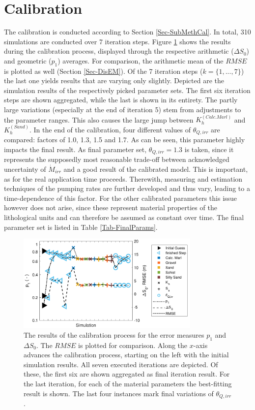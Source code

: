 \section{Calibration}

The calibration is conducted according to Section \ref{Sec-SubMethCal}. 
In total, 310 simulations are conducted over 7 iteration steps. 
Figure \ref{Fig-CalibResults} shows the results during the calibration process, displayed through the respective arithmetic ($\Delta S_0$) and geometric ($p_1$) averages. 
For comparison, the arithmetic mean of the $RMSE$ is plotted as well (Section \ref{Sec-DisEM}). 
Of the 7 iteration steps ($k = \{ 1,...,7\}$) the last one yields results that are varying only slightly. 
Depicted are the simulation results of the respectively picked parameter sets. 
The first six iteration steps are shown aggregated, while the last is shown in its entirety. 
The partly large variations (especially at the end of iteration 5) stem from adjustments to the parameter ranges. 
This also causes the large jump between $K_h^{(Calc. Marl)}$ and $K_h^{(Sand)}$. 
In the end of the calibration, four different values of $\theta_{Q,irr}$ are compared: factors of 1.0, 1.3, 1.5 and 1.7. 
As can be seen, this parameter highly impacts the final result. 
As final parameter set, $\theta_{Q,irr}=1.3$ is taken, since it represents the supposedly most reasonable trade-off between acknowledged uncertainty of $\dot{M}_{irr}$ and a good result of the calibrated model. 
This is important, as for the real application time proceeds. 
Therewith, measuring and estimation techniques of the pumping rates are further developed and thus vary, leading to a time-dependence of this factor. 
For the other calibrated parameters this issue however does not arise, since these represent material properties of the lithological units and can therefore be assumed as constant over time. 
The final parameter set is listed in Table \ref{Tab-FinalParams}.

\begin{figure}[h]
    \centering
    \includegraphics[width=0.8\textwidth]{./img/Fig-CalibResults.pdf}
    \caption{The results of the calibration process for the error measures $p_1$ and $\Delta S_0$. The $RMSE$ is plotted for comparison. Along the $x$-axis advances the calibration process, starting on the left with the initial simulation results. All seven executed iterations are depicted. Of these, the first six are shown aggregated as final iteration result. For the last iteration, for each of the material parameters the best-fitting result is shown. The last four instances mark final variations of $\theta_{Q,irr}$.}
    \label{Fig-CalibResults}
\end{figure}

